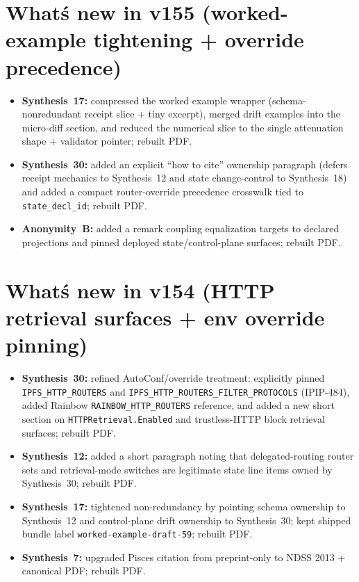 \documentclass[11pt]{article}
\begin{document}
\section{What\'s new in v155 (worked-example tightening + override precedence)}
\begin{itemize}[leftmargin=*]
\item \textbf{Synthesis~17:} compressed the worked example wrapper (schema-nonredundant receipt slice + tiny excerpt), merged drift examples into the micro-diff section, and reduced the numerical slice to the single attenuation shape + validator pointer; rebuilt PDF.
\item \textbf{Synthesis~30:} added an explicit ``how to cite'' ownership paragraph (defers receipt mechanics to Synthesis~12 and state change-control to Synthesis~18) and added a compact router-override precedence crosswalk tied to \texttt{state\_decl\_id}; rebuilt PDF.
\item \textbf{Anonymity~B:} added a remark coupling equalization targets to declared projections and pinned deployed state/control-plane surfaces; rebuilt PDF.
\end{itemize}

\section{What\'s new in v154 (HTTP retrieval surfaces + env override pinning)}
\begin{itemize}[leftmargin=*]
\item \textbf{Synthesis~30:} refined AutoConf/override treatment: explicitly pinned \texttt{IPFS\_HTTP\_ROUTERS} and \texttt{IPFS\_HTTP\_ROUTERS\_FILTER\_PROTOCOLS} (IPIP-484), added Rainbow \texttt{RAINBOW\_HTTP\_ROUTERS} reference, and added a new short section on \texttt{HTTPRetrieval.Enabled} and trustless-HTTP block retrieval surfaces; rebuilt PDF.
\item \textbf{Synthesis~12:} added a short paragraph noting that delegated-routing router sets and retrieval-mode switches are legitimate state line items owned by Synthesis~30; rebuilt PDF.
\item \textbf{Synthesis~17:} tightened non-redundancy by pointing schema ownership to Synthesis~12 and control-plane drift ownership to Synthesis~30; kept shipped bundle label \texttt{worked-example-draft-59}; rebuilt PDF.
\item \textbf{Synthesis~7:} upgraded Pisces citation from preprint-only to NDSS 2013 + canonical PDF; rebuilt PDF.
\end{itemize}
\end{document}
